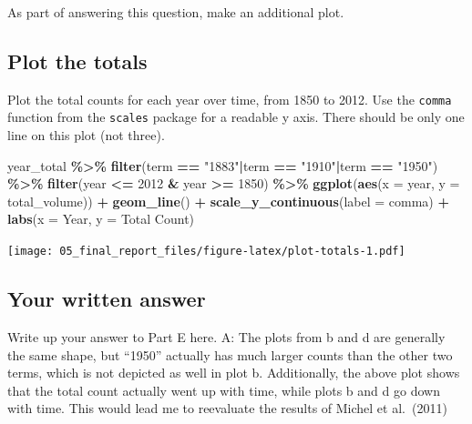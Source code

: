 \documentclass[
]{article}
\newenvironment{Shaded}{\begin{snugshade}}{\end{snugshade}}
\newcommand{\AttributeTok}[1]{\textcolor[rgb]{0.13,0.29,0.53}{#1}}
\newcommand{\DecValTok}[1]{\textcolor[rgb]{0.00,0.00,0.81}{#1}}
\newcommand{\FunctionTok}[1]{\textcolor[rgb]{0.13,0.29,0.53}{\textbf{#1}}}
\newcommand{\NormalTok}[1]{#1}
\newcommand{\SpecialCharTok}[1]{\textcolor[rgb]{0.81,0.36,0.00}{\textbf{#1}}}
\newcommand{\StringTok}[1]{\textcolor[rgb]{0.31,0.60,0.02}{#1}}
\begin{document}
As part of answering this question, make an additional plot.

\hypertarget{plot-the-totals}{%
\subsection{Plot the totals}\label{plot-the-totals}}

Plot the total counts for each year over time, from 1850 to 2012. Use
the \texttt{comma} function from the \texttt{scales} package for a
readable y axis. There should be only one line on this plot (not three).

\begin{Shaded}
\begin{Highlighting}[]
\NormalTok{year\_total }\SpecialCharTok{\%\textgreater{}\%}
  \FunctionTok{filter}\NormalTok{(term }\SpecialCharTok{==} \StringTok{"1883"}\SpecialCharTok{|}\NormalTok{term }\SpecialCharTok{==} \StringTok{"1910"}\SpecialCharTok{|}\NormalTok{term }\SpecialCharTok{==} \StringTok{"1950"}\NormalTok{) }\SpecialCharTok{\%\textgreater{}\%} 
  \FunctionTok{filter}\NormalTok{(year }\SpecialCharTok{\textless{}=} \DecValTok{2012} \SpecialCharTok{\&}\NormalTok{ year }\SpecialCharTok{\textgreater{}=} \DecValTok{1850}\NormalTok{) }\SpecialCharTok{\%\textgreater{}\%} 
  \FunctionTok{ggplot}\NormalTok{(}\FunctionTok{aes}\NormalTok{(}\AttributeTok{x =}\NormalTok{ year, }\AttributeTok{y =}\NormalTok{ total\_volume)) }\SpecialCharTok{+}
  \FunctionTok{geom\_line}\NormalTok{() }\SpecialCharTok{+}
  \FunctionTok{scale\_y\_continuous}\NormalTok{(}\AttributeTok{label =}\NormalTok{ comma) }\SpecialCharTok{+}
  \FunctionTok{labs}\NormalTok{(}\AttributeTok{x =} \StringTok{\textquotesingle{}Year\textquotesingle{}}\NormalTok{, }\AttributeTok{y =} \StringTok{\textquotesingle{}Total Count\textquotesingle{}}\NormalTok{)}
\end{Highlighting}
\end{Shaded}

\texttt{[image: 05\_final\_report\_files/figure-latex/plot-totals-1.pdf]}

\hypertarget{your-written-answer-3}{%
\subsection{Your written answer}\label{your-written-answer-3}}

Write up your answer to Part E here. A: The plots from b and d are
generally the same shape, but ``1950'' actually has much larger counts
than the other two terms, which is not depicted as well in plot b.
Additionally, the above plot shows that the total count actually went up
with time, while plots b and d go down with time. This would lead me to
reevaluate the results of Michel et al.~(2011)
\end{document}
